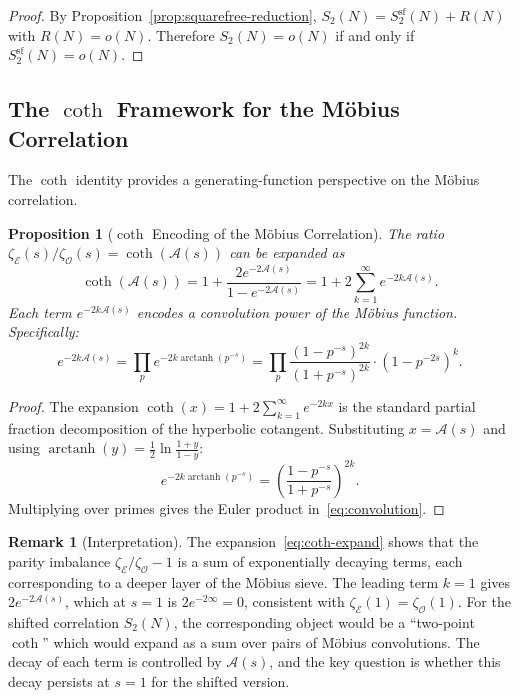 \documentclass[11pt,a4paper]{article}
\theoremstyle{plain}
\newtheorem{proposition}[theorem]{Proposition}
\theoremstyle{definition}
\newtheorem{remark}[theorem]{Remark}
\newcommand{\EE}{\mathcal{E}}
\newcommand{\OO}{\mathcal{O}}
\newcommand{\cA}{\mathcal{A}}
\begin{document}
\begin{proof}
By Proposition~\ref{prop:squarefree-reduction}, $S_2(N) = S_2^{\mathrm{sf}}(N) + R(N)$ with $R(N) = o(N)$. Therefore $S_2(N) = o(N)$ if and only if $S_2^{\mathrm{sf}}(N) = o(N)$.
\end{proof}

\subsection{The $\coth$ Framework for the M\"obius Correlation}

The $\coth$ identity provides a generating-function perspective on the M\"obius correlation.

\begin{proposition}[$\coth$ Encoding of the M\"obius Correlation]\label{prop:coth-mu}
The ratio $\zeta_{\EE}(s)/\zeta_{\OO}(s) = \coth(\cA(s))$ can be expanded as
\begin{equation}\label{eq:coth-expand}
\coth(\cA(s)) = 1 + \frac{2e^{-2\cA(s)}}{1 - e^{-2\cA(s)}} = 1 + 2\sum_{k=1}^{\infty} e^{-2k\cA(s)}.
\end{equation}
Each term $e^{-2k\cA(s)}$ encodes a convolution power of the M\"obius function. Specifically:
\begin{equation}\label{eq:convolution}
e^{-2k\cA(s)} = \prod_p e^{-2k \operatorname{arctanh}(p^{-s})} = \prod_p \frac{(1 - p^{-s})^{2k}}{(1 + p^{-s})^{2k}} \cdot (1 - p^{-2s})^k.
\end{equation}
\end{proposition}

\begin{proof}
The expansion $\coth(x) = 1 + 2\sum_{k=1}^{\infty} e^{-2kx}$ is the standard partial fraction decomposition of the hyperbolic cotangent. Substituting $x = \cA(s)$ and using $\operatorname{arctanh}(y) = \frac{1}{2}\ln\frac{1+y}{1-y}$:
\[
e^{-2k\operatorname{arctanh}(p^{-s})} = \left(\frac{1-p^{-s}}{1+p^{-s}}\right)^{2k}.
\]
Multiplying over primes gives the Euler product in~\eqref{eq:convolution}.
\end{proof}

\begin{remark}[Interpretation]
The expansion~\eqref{eq:coth-expand} shows that the parity imbalance $\zeta_{\EE}/\zeta_{\OO} - 1$ is a sum of exponentially decaying terms, each corresponding to a deeper layer of the M\"obius sieve. The leading term $k = 1$ gives $2e^{-2\cA(s)}$, which at $s = 1$ is $2e^{-2\infty} = 0$, consistent with $\zeta_{\EE}(1) = \zeta_{\OO}(1)$. For the shifted correlation $S_2(N)$, the corresponding object would be a ``two-point $\coth$'' which would expand as a sum over pairs of M\"obius convolutions. The decay of each term is controlled by $\cA(s)$, and the key question is whether this decay persists at $s = 1$ for the shifted version.
\end{remark}
\end{document}
